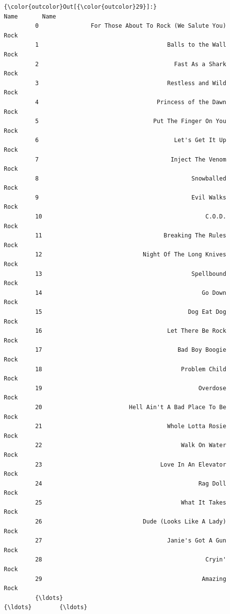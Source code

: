 \documentclass[11pt]{article}
\begin{document}
\begin{Verbatim}[commandchars=\\\{\}]
{\color{outcolor}Out[{\color{outcolor}29}]:}                                                    Name       Name
         0               For Those About To Rock (We Salute You)       Rock
         1                                     Balls to the Wall       Rock
         2                                       Fast As a Shark       Rock
         3                                     Restless and Wild       Rock
         4                                  Princess of the Dawn       Rock
         5                                 Put The Finger On You       Rock
         6                                       Let's Get It Up       Rock
         7                                      Inject The Venom       Rock
         8                                            Snowballed       Rock
         9                                            Evil Walks       Rock
         10                                               C.O.D.       Rock
         11                                   Breaking The Rules       Rock
         12                             Night Of The Long Knives       Rock
         13                                           Spellbound       Rock
         14                                              Go Down       Rock
         15                                          Dog Eat Dog       Rock
         16                                    Let There Be Rock       Rock
         17                                       Bad Boy Boogie       Rock
         18                                        Problem Child       Rock
         19                                             Overdose       Rock
         20                         Hell Ain't A Bad Place To Be       Rock
         21                                    Whole Lotta Rosie       Rock
         22                                        Walk On Water       Rock
         23                                  Love In An Elevator       Rock
         24                                             Rag Doll       Rock
         25                                        What It Takes       Rock
         26                             Dude (Looks Like A Lady)       Rock
         27                                    Janie's Got A Gun       Rock
         28                                               Cryin'       Rock
         29                                              Amazing       Rock
         {\ldots}                                                 {\ldots}        {\ldots}

\end{Verbatim}
\end{document}
